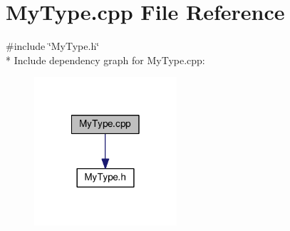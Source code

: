 \section{My\-Type.\-cpp File Reference}
\label{_my_type_8cpp}
{\ttfamily \#include \char`\"{}My\-Type.\-h\char`\"{}}\\*
Include dependency graph for My\-Type.\-cpp\-:
\nopagebreak
\begin{figure}[H]
\begin{center}
\leavevmode
\includegraphics[width=150pt]{_my_type_8cpp__incl}
\end{center}
\end{figure}
